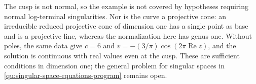 The cusp is not normal, so the example is not covered by hypotheses requiring normal log-terminal singularities. Nor is the curve a projective cone: an irreducible reduced projective cone of dimension one has a single point as base and is a projective line, whereas the normalization here has genus one. Without poles, the same data give $c=6$ and $v=-(3/\pi)\cos(2\pi\operatorname{Re}z)$, and the solution is continuous with real values even at the cusp. These are sufficient conditions in dimension one; the general problem for singular spaces in \cref{qu:singular-space-equations-program} remains open.


